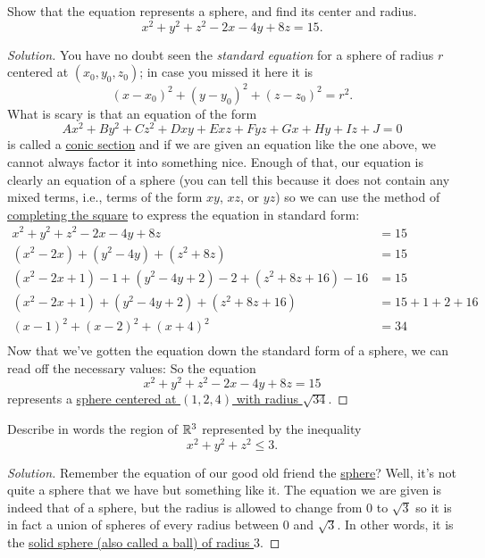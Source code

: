 \begin{problem}
Show that the equation represents a sphere, and find its center and radius.
\[
x^2+y^2+z^2-2x-4y+8z=15.
\]
\end{problem}
\begin{proof}[Solution]
You have no doubt seen the \emph{standard equation} for a sphere of
radius $r$ centered at $\left(x_0,y_0,z_0\right)$; in case you missed it
here it is
\begin{equation}
\label{eq:sphere}
\left(x-x_0\right)^2+\left(y-y_0\right)^2+\left(z-z_0\right)^2=r^2.
\end{equation}
What is scary is that an equation of the form
\[
Ax^2+By^2+Cz^2+Dxy+Exz+Fyz+Gx+Hy+Iz+J=0
\]
is called a \href{https://en.wikipedia.org/wiki/Conic_section}{conic
  section} and if we are given an equation like the one above, we cannot
always factor it into something nice. Enough of that, our equation is
clearly an equation of a sphere (you can tell this because it does not
contain any mixed terms, i.e., terms of the form $xy$, $xz$, or $yz$) so we
can use the method of
\href{https://en.wikipedia.org/wiki/Completing_the_square}{completing the
  square} to express the equation in standard form:
\begin{align*}
x^2+y^2+z^2-2x-4y+8z&=15\\
\left(x^2-2x\right)+\left(y^2-4y\right)+\left(z^2+8z\right)&=15\\
\left(x^2-2x+1\right)-1+\left(y^2-4y+2\right)-2+\left(z^2+8z+16\right)-16&=15\\
\left(x^2-2x+1\right)+\left(y^2-4y+2\right)+\left(z^2+8z+16\right)&=15+1+2+16\\
\left(x-1\right)^2+\left(x-2\right)^2+\left(x+4\right)^2&=34\\
\end{align*}
Now that we've gotten the equation down the standard form of a sphere, we
can read off the necessary values: So the equation
\[
x^2+y^2+z^2-2x-4y+8z=15
\]
represents a \ul{sphere centered at $(1,2,4)$ with radius $\sqrt{34}$}.
\end{proof}

\begin{problem}
Describe in words the region of $\mathbb{R}^3$ represented by the inequality
\[
x^2+y^2+z^2\leq 3.
\]
\end{problem}
\begin{proof}[Solution]
  Remember the equation of our good old friend the
  \hyperref[eq:sphere]{sphere}? Well, it's not quite a sphere that we have
  but something like it. The equation we are given is indeed that of a
  sphere, but the radius is allowed to change from $0$ to $\sqrt{3}$ so it
  is in fact a union of spheres of every radius between $0$ and
  $\sqrt{3}$. In other words, it is the \ul{solid sphere (also called a
    ball) of radius $3$}.
\end{proof}

